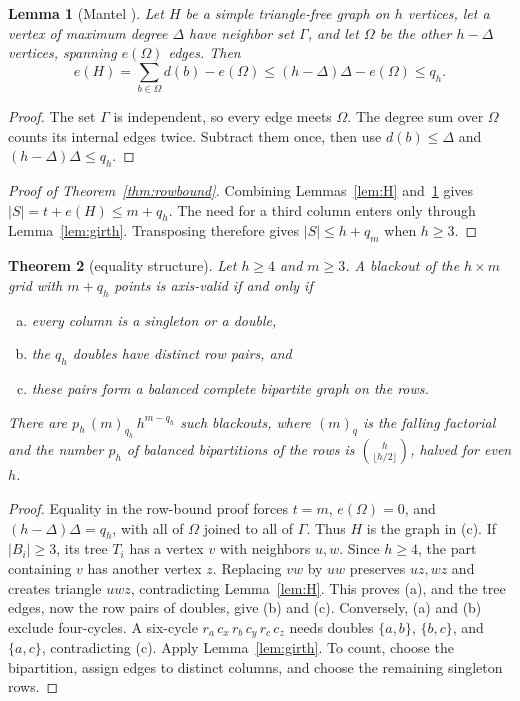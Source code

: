 \documentclass[12pt]{article}
\theoremstyle{plain}
\newtheorem{theorem}{Theorem}
\newtheorem{lemma}[theorem]{Lemma}
\theoremstyle{definition}
\theoremstyle{remark}
\begin{document}
\begin{lemma}[Mantel \cite{mantel1907}]\label{lem:mantel}
Let $H$ be a simple triangle-free graph on $h$ vertices, let a vertex of maximum degree $\Delta$ have neighbor set $\Gamma$, and let $\Omega$ be the other $h-\Delta$ vertices, spanning $e(\Omega)$ edges. Then
\[
e(H)=\sum_{b\in\Omega}d(b)-e(\Omega)\le(h-\Delta)\Delta-e(\Omega)\le q_h.
\]
\end{lemma}

\begin{proof}
The set $\Gamma$ is independent, so every edge meets $\Omega$.
The degree sum over $\Omega$ counts its internal edges twice.
Subtract them once, then use $d(b)\le\Delta$ and
$(h-\Delta)\Delta\le q_h$.
\end{proof}

\begin{proof}[Proof of Theorem~\ref{thm:rowbound}]
Combining Lemmas~\ref{lem:H} and~\ref{lem:mantel} gives
$|S|=t+e(H)\le m+q_h$. The need for a third column enters only through
Lemma~\ref{lem:girth}. Transposing therefore gives $|S|\le h+q_m$ when
$h\ge3$.
\end{proof}

\begin{theorem}[equality structure]\label{thm:equality}
Let $h\ge4$ and $m\ge3$. A blackout of the $h\times m$ grid with $m+q_h$ points is axis-valid if and only if
\begin{enumerate}[(a)]
\item every column is a singleton or a double,
\item the $q_h$ doubles have distinct row pairs, and
\item these pairs form a balanced complete bipartite graph on the rows.
\end{enumerate}
There are $p_h\,(m)_{q_h}\,h^{m-q_h}$ such blackouts, where $(m)_q$ is the falling factorial and the number $p_h$ of balanced bipartitions of the rows is $\binom h{\lfloor h/2\rfloor}$, halved for even $h$.
\end{theorem}

\begin{proof}
Equality in the row-bound proof forces $t=m$, $e(\Omega)=0$, and
$(h-\Delta)\Delta=q_h$, with all of $\Omega$ joined to all of $\Gamma$.
Thus $H$ is the graph in (c).
If $|B_i|\ge3$, its tree $T_i$ has a vertex $v$ with neighbors $u,w$.
Since $h\ge4$, the part containing $v$ has another vertex $z$.
Replacing $vw$ by $uw$ preserves $uz,wz$ and creates triangle $uwz$,
contradicting Lemma~\ref{lem:H}. This proves (a), and the tree edges,
now the row pairs of doubles, give (b) and (c).
Conversely, (a) and (b) exclude four-cycles. A six-cycle
$r_a\,c_x\,r_b\,c_y\,r_c\,c_z$ needs doubles $\{a,b\}$,
$\{b,c\}$, and $\{a,c\}$, contradicting (c).
Apply Lemma~\ref{lem:girth}. To count, choose the bipartition,
assign edges to distinct columns, and choose the remaining singleton rows.
\end{proof}
\end{document}
